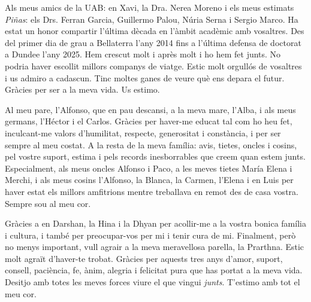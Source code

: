 Als meus amics de la UAB: en Xavi, la Dra. Nerea Moreno i els meus estimats \textit{Piñas}: els Drs. Ferran Garcia, Guillermo Palou, Núria Serna i Sergio Marco. Ha estat un honor compartir l'última dècada en l'àmbit acadèmic amb vosaltres. Des del primer dia de grau a Bellaterra l'any 2014 fins a l'última defensa de doctorat a Dundee l'any 2025. Hem crescut molt i après molt i ho hem fet junts. No podria haver escollit millors companys de viatge. Estic molt orgullós de vosaltres i us admiro a cadascun. Tinc moltes ganes de veure què ens depara el futur. Gràcies per ser a la meva vida. Us estimo.

Al meu pare, l'Alfonso, que en pau descansi, a la meva mare, l'Alba, i als meus germans, l'Héctor i el Carlos. Gràcies per haver-me educat tal com ho heu fet, inculcant-me valors d'humilitat, respecte, generositat i constància, i per ser sempre al meu costat. A la resta de la meva família: avis, tietes, oncles i cosins, pel vostre suport, estima i pels records inesborrables que creem quan estem junts. Especialment, als meus oncles Alfonso i Paco, a les meves tietes María Elena i Merchi, i als meus cosins l'Alfonso, la Blanca, la Carmen, l'Elena i en Luis per haver estat els millors amfitrions mentre treballava en remot des de casa vostra. Sempre sou al meu cor.

Gràcies a en Darshan, la Hina i la Dhyan per acollir-me a la vostra bonica família i cultura, i també per preocupar-vos per mi i tenir cura de mi. Finalment, però no menys important, vull agrair a la meva meravellosa parella, la Prarthna. Estic molt agraït d'haver-te trobat. Gràcies per aquests tres anys d'amor, suport, consell, paciència, fe, ànim, alegria i felicitat pura que has portat a la meva vida. Desitjo amb totes les meves forces viure el que vingui \textit{junts}. T'estimo amb tot el meu cor.